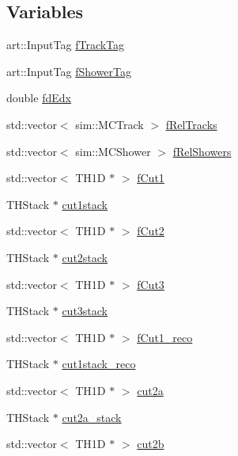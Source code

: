 \subsection*{Variables}
\begin{DoxyCompactItemize}
\item 
art::InputTag \hyperlink{namespaceana_1_1SBNOsc_adabde93df02e88c081f79f1e98052f59}{fTrackTag}
\item 
art::InputTag \hyperlink{namespaceana_1_1SBNOsc_add9629697b222d44721995afd2fa694d}{fShowerTag}
\item 
double \hyperlink{namespaceana_1_1SBNOsc_ad834236bb006b3a55bbe7ae130d1f676}{fdEdx}
\item 
std::vector$<$ sim::MCTrack $>$ \hyperlink{namespaceana_1_1SBNOsc_a91abcb43a0813753bf8d88336515df12}{fRelTracks}
\item 
std::vector$<$ sim::MCShower $>$ \hyperlink{namespaceana_1_1SBNOsc_a835384228e9ece629d6af6a74abfadeb}{fRelShowers}
\item 
std::vector$<$ TH1D $\ast$ $>$ \hyperlink{namespaceana_1_1SBNOsc_a2b70de8a58ae31f4f22507b834355ca3}{fCut1}
\item 
THStack $\ast$ \hyperlink{namespaceana_1_1SBNOsc_af8390393ea68437d73758036b740a73f}{cut1stack}
\item 
std::vector$<$ TH1D $\ast$ $>$ \hyperlink{namespaceana_1_1SBNOsc_a43e7785299a377e013e7f6269265aa97}{fCut2}
\item 
THStack $\ast$ \hyperlink{namespaceana_1_1SBNOsc_a4759d52cc74712f52a292470ae186ac9}{cut2stack}
\item 
std::vector$<$ TH1D $\ast$ $>$ \hyperlink{namespaceana_1_1SBNOsc_af6006c681af8f13be0876d4f8b8269a4}{fCut3}
\item 
THStack $\ast$ \hyperlink{namespaceana_1_1SBNOsc_a59ec32e8647b070c9eedcc543a4ff12b}{cut3stack}
\item 
std::vector$<$ TH1D $\ast$ $>$ \hyperlink{namespaceana_1_1SBNOsc_a6a5934f9b51a16fc44557f0db1333821}{fCut1\_\-reco}
\item 
THStack $\ast$ \hyperlink{namespaceana_1_1SBNOsc_a5b54ee23ff0072697a843d8a459efdfc}{cut1stack\_\-reco}
\item 
std::vector$<$ TH1D $\ast$ $>$ \hyperlink{namespaceana_1_1SBNOsc_a9b9151469b378e181b41a28c26adc0e5}{cut2a}
\item 
THStack $\ast$ \hyperlink{namespaceana_1_1SBNOsc_a0c223e1ce88af244e57230b4772e1c43}{cut2a\_\-stack}
\item 
std::vector$<$ TH1D $\ast$ $>$ \hyperlink{namespaceana_1_1SBNOsc_a13e04f5a0bc2bf349e9947a45bc609bb}{cut2b}

\end{DoxyCompactItemize}
